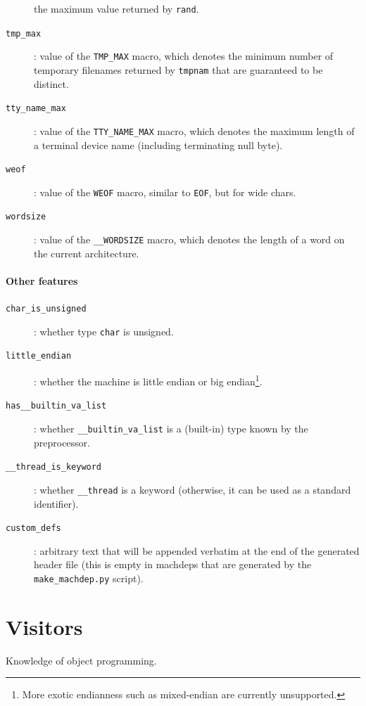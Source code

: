 \begin{description}
    the maximum value returned by \texttt{rand}.
  \item[\texttt{tmp\_max}]: value of the \texttt{TMP\_MAX} macro, which denotes
    the minimum number of temporary filenames returned by \texttt{tmpnam} that
    are guaranteed to be distinct.
  \item[\texttt{tty\_name\_max}]: value of the \texttt{TTY\_NAME\_MAX} macro, which
    denotes the maximum length of a terminal device name (including terminating null byte).
  \item[\texttt{weof}]: value of the \texttt{WEOF} macro, similar to \texttt{EOF},
    but for wide chars.
  \item[\texttt{wordsize}]: value of the \texttt{\_\_WORDSIZE} macro, which denotes
    the length of a word on the current architecture.
\end{description}

\paragraph{Other features}
\begin{description}
  \item[\texttt{char\_is\_unsigned}]: whether type \verb+char+ is unsigned.
  \item[\texttt{little\_endian}]: whether the machine is little endian or big
    endian\footnote{More exotic endianness such as mixed-endian are currently unsupported.}.
  \item[\texttt{has\_\_builtin\_va\_list}]: whether \verb+__builtin_va_list+
    is a (built-in) type known by the preprocessor.
  \item[\texttt{\_\_thread\_is\_keyword}]: whether \verb+__thread+ is a
    keyword (otherwise, it can be used as a standard identifier).
  \item[\texttt{custom\_defs}]: arbitrary text that will be appended
    verbatim at the
    end of the generated header file (this is empty in machdeps that are
    generated by the \texttt{make\_machdep.py} script).
\end{description}


\section{Visitors}\label{adv:visitors}

\begin{prereq}
  Knowledge of \caml object programming.
\end{prereq}


